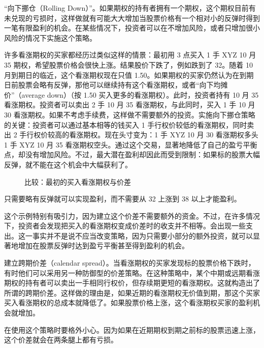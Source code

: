 “向下挪仓（Rolling Down）”。如果期权的持有者拥有一个期权，这个期权目前有未兑现的亏损时，这样做就有可能大大增加当股票价格有一个相对小的反弹时得到一笔有限盈利的机会。在某些情况下，投资者可以在不增加风险，或者只增加很小风险的情况下实施这个策略。

许多看涨期权的买家都经历过类似这样的情景：最初用 3 点买入 1 手 XYZ 10 月 35 期权，希望股票价格会很快上涨。结果股价下跌了，例如跌到了 32。随着 10 月到期日的临近，这个看涨期权现在只值 1.50。如果期权的买家仍然认为在到期日前股票会略有反弹，那他可以继续持有这个看涨期权，或者“向下均摊价”（average down）（按 1.50 买入更多的看涨期权）。此时，投资者持有 10 月 35 看涨期权。投资者可以卖出 2 手 10 月 35 看涨期权，与此同时，买入 1 手 10 月 30 看涨期权。如果不考虑手续费，这样做不需要额外的投资。实施向下挪仓策略的关键：投资者可以通过基本相等的钱买入 1 手行权价较低的看涨期权，同时卖出 2 手行权价较高的看涨期权。现在头寸变为：1 手 XYZ 10 月 30 看涨期权多头 1 手 XYZ 10 月 35 看涨期权空头。通过这个交易，显著地降低了自己的盈亏平衡点，却没有增加风险。不过，最大潜在盈利却因此而受到限制：如果标的股票大幅反弹，就不能在这个机会中大幅获利了。
\begin{figure}
    \centering
    \caption{比较：最初的买入看涨期权与价差}
\end{figure}

只需要略有反弹就可以实现盈利，而不需要从 32 上涨到 38 以上才能盈利。

这个示例特别有吸引力，因为建立这个价差不需要额外的资金。不过，在许多情况下，投资者会发现把买入的看涨期权变成价差时的收支并不相等。会出现一些支出。这一事实并不是说不应当改变策略，因为只需要小部分的额外投资，就可以显著地增加在股票反弹时达到盈亏平衡甚至得到盈利的机会。

建立跨期价差（calendar spread）。当看涨期权的买家发现标的股票价格下跌时，有时他们可以采用另一种防御型的价差策略。在这种策略中，某个中期或远期看涨期权的持有者可以卖出一手相同行权价，但存续期更短的看涨期权。这就构造出了所谓的跨期价差。这样做的理由是，如果近期的看涨期权无价值到期，那这个买家买入看涨期权的总成本就降低了。如果股票价格上涨，这个看涨期权买家的盈利机会就增加。

在使用这个策略时要格外小心。因为如果在近期期权到期之前标的股票迅速上涨，这个价差就会在两条腿上都有亏损。